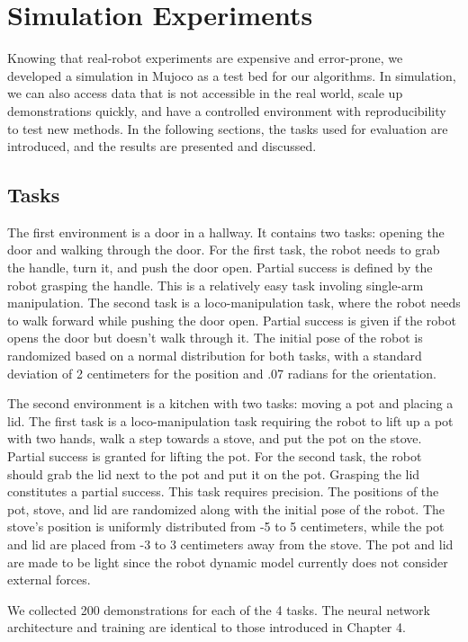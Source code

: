 \chapter{Simulation Experiments}

Knowing that real-robot experiments are expensive and error-prone, we developed a simulation in Mujoco as a test bed for our algorithms. In simulation, we can also access data that is not accessible in the real world, scale up demonstrations quickly, and have a controlled environment with reproducibility to test new methods. In the following sections, the tasks used for evaluation are introduced, and the results are presented and discussed. 

\section{Tasks}

The first environment is a door in a hallway. It contains two tasks: opening the door and walking through the door. For the first task, the robot needs to grab the handle, turn it, and push the door open. Partial success is defined by the robot grasping the handle. This is a relatively easy task involing single-arm manipulation. The second task is a loco-manipulation task, where the robot needs to walk forward while pushing the door open. Partial success is given if the robot opens the door but doesn't walk through it. The initial pose of the robot is randomized based on a normal distribution for both tasks, with a standard deviation of 2 centimeters for the position and .07 radians for the orientation. 

The second environment is a kitchen with two tasks: moving a pot and placing a lid. The first task is a loco-manipulation task requiring the robot to lift up a pot with two hands, walk a step towards a stove, and put the pot on the stove. Partial success is granted for lifting the pot. For the second task, the robot should grab the lid next to the pot and put it on the pot. Grasping the lid constitutes a partial success. This task requires precision. The positions of the pot, stove, and lid are randomized along with the initial pose of the robot. The stove's position is uniformly distributed from -5 to 5 centimeters, while the pot and lid are placed from -3 to 3 centimeters away from the stove. The pot and lid are made to be light since the robot dynamic model currently does not consider external forces. 

We collected 200 demonstrations for each of the 4 tasks. The neural network architecture and training are identical to those introduced in Chapter 4. 

